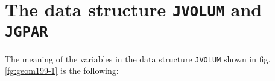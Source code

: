                      

\section{The data structure {\tt JVOLUM} and {\tt JGPAR}}

The meaning of the variables in the data structure {\tt JVOLUM} shown
in fig. \ref{fg:geom199-1}
is the following:

